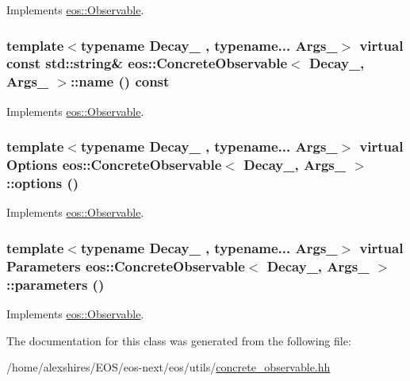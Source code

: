 Implements \hyperlink{classeos_1_1Observable_a8bfd8cc2873e467ac9ae100d029d8c49}{eos::Observable}.\hypertarget{classeos_1_1ConcreteObservable_a777d479052396c8dc1b73f752fdb3539}{
\subsubsection[{name}]{\setlength{\rightskip}{0pt plus 5cm}template$<$typename Decay\_\- , typename... Args\_\-$>$ virtual const std::string\& {\bf eos::ConcreteObservable}$<$ Decay\_\-, Args\_\- $>$::name () const}}
\label{classeos_1_1ConcreteObservable_a777d479052396c8dc1b73f752fdb3539}


Implements \hyperlink{classeos_1_1Observable_adfdc8fe469e00adeb464d3b3e4e14236}{eos::Observable}.\hypertarget{classeos_1_1ConcreteObservable_ac8f34b0c5dc087982bf0d7b053cf07b5}{
\subsubsection[{options}]{\setlength{\rightskip}{0pt plus 5cm}template$<$typename Decay\_\- , typename... Args\_\-$>$ virtual {\bf Options} {\bf eos::ConcreteObservable}$<$ Decay\_\-, Args\_\- $>$::options ()}}
\label{classeos_1_1ConcreteObservable_ac8f34b0c5dc087982bf0d7b053cf07b5}


Implements \hyperlink{classeos_1_1Observable_a237cf968a4f46a93e0cc8ba0fdbaceee}{eos::Observable}.\hypertarget{classeos_1_1ConcreteObservable_af5265ce9314987a7b7b01275b5410309}{
\subsubsection[{parameters}]{\setlength{\rightskip}{0pt plus 5cm}template$<$typename Decay\_\- , typename... Args\_\-$>$ virtual {\bf Parameters} {\bf eos::ConcreteObservable}$<$ Decay\_\-, Args\_\- $>$::parameters ()}}
\label{classeos_1_1ConcreteObservable_af5265ce9314987a7b7b01275b5410309}


Implements \hyperlink{classeos_1_1Observable_a233852d22f287944b8bbf4da803289b1}{eos::Observable}.

The documentation for this class was generated from the following file:\begin{DoxyCompactItemize}
\item 
/home/alexshires/EOS/eos-\/next/eos/utils/\hyperlink{concrete__observable_8hh}{concrete\_\-observable.hh}\end{DoxyCompactItemize}
